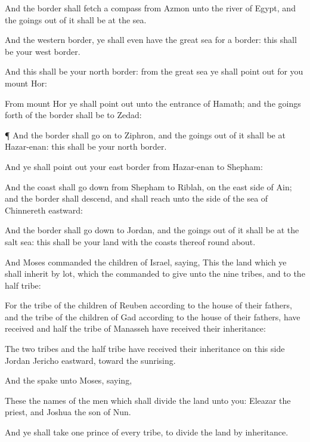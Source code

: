 {And the
border shall fetch a
compass from
Azmon unto the
river of
Egypt, and the goings
out of it shall be at the
sea.

And
{} the
western
border, ye shall even have the
great
sea for a
border: this shall be your
west
border.

And this shall be your
north
border: from the
great
sea ye shall point
out for you
mount
Hor:

From
mount
Hor ye shall point
out
{} unto the
entrance of
Hamath; and the goings
forth of the
border shall be to
Zedad:


\par }{\PP {}¶ And the
border shall go
on to
Ziphron, and the goings
out of it shall be at
Hazar-enan: this shall be your
north
border.

And ye shall point
out your
east
border from
Hazar-enan to
Shepham:

And the
coast shall go
down from
Shepham to
Riblah, on the east
side of
Ain; and the
border shall
descend, and shall
reach unto the
side of the
sea of
Chinnereth
eastward:

And the
border shall go
down to
Jordan, and the goings
out of it shall be at the
salt
sea: this shall be your
land with the
coasts thereof round
about.

And
Moses
commanded the
children of
Israel,
saying, This
{} the
land which ye shall
inherit by
lot, which the
{}
commanded to
give unto the
nine
tribes, and to the
half
tribe:

For the
tribe of the
children of
Reuben according to the
house of their
fathers, and the
tribe of the
children of
Gad according to the
house of their
fathers, have
received
{} and
half the
tribe of
Manasseh have
received their
inheritance:

The
two
tribes and the
half
tribe have
received their
inheritance on this
side
Jordan
{}
Jericho
eastward, toward the
sunrising.


\par }{\PP {}And the
{}
spake unto
Moses,
saying,

These
{} the
names of the
men which shall
divide the
land unto you:
Eleazar the
priest, and
Joshua the
son of
Nun.

And ye shall
take
one
prince of every
tribe, to
divide the
land by
inheritance.

}
